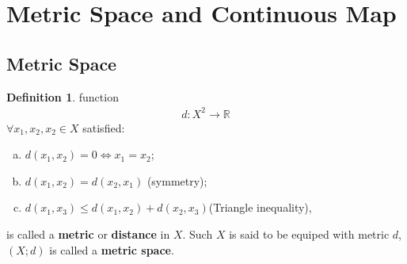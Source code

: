 \documentclass{article}
\theoremstyle{plain}
\theoremstyle{definition}
\newtheorem{dfn}{Definition}[section] %
\begin{document}
\tableofcontents
\newpage
\section{Metric Space and Continuous Map}
\subsection{Metric Space}
\begin{dfn}\label{metric_def} function
\begin{align}\label{metric}
	d:X^2\to\mathbb{R}
\end{align}
	$\forall x_1,x_2,x_2\in X$ satisfied: 
	\begin{enumerate}[a)]
	\item	$d(x_1,x_2)=0\Leftrightarrow x_1=x_2$;
	\item	$d(x_1,x_2)=d(x_2,x_1)$ (symmetry);
	\item	$d(x_1,x_3)\leqslant d(x_1,x_2)+d(x_2,x_3)$(Triangle inequality),
	\end{enumerate}
	is called a \textbf{metric} or \textbf{distance} in $X$. Such $X$ is said to be equiped with metric $d$, $(X;d)$ is called a \textbf{metric space}.
\end{dfn}
\end{document}
